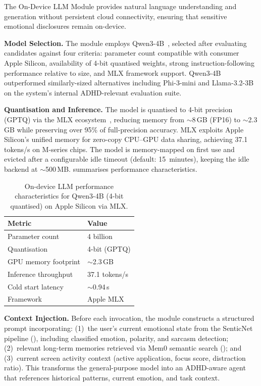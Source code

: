 The On-Device LLM Module provides natural language understanding and generation without persistent cloud connectivity, ensuring that sensitive emotional disclosures remain on-device.

\textbf{Model Selection.} The module employs Qwen3-4B~\cite{yang2025}, selected after evaluating candidates against four criteria: parameter count compatible with consumer Apple Silicon, availability of 4-bit quantised weights, strong instruction-following performance relative to size, and MLX framework support. Qwen3-4B outperformed similarly-sized alternatives including Phi-3-mini and Llama-3.2-3B on the system's internal ADHD-relevant evaluation suite.

\textbf{Quantisation and Inference.} The model is quantised to 4-bit precision (GPTQ) via the MLX ecosystem~\cite{hannun2023}, reducing memory from $\sim$8\,GB (FP16) to $\sim$2.3\,GB while preserving over 95\% of full-precision accuracy. MLX exploits Apple Silicon's unified memory for zero-copy CPU--GPU data sharing, achieving 37.1 tokens/s on M-series chips. The model is memory-mapped on first use and evicted after a configurable idle timeout (default: 15~minutes), keeping the idle backend at $\sim$500\,MB.  summarises performance characteristics.

\begin{table}[htbp]
  \centering
  \caption{On-device LLM performance characteristics for Qwen3-4B (4-bit quantised) on Apple Silicon via MLX.}
  \label{tab:llm_performance}
  \begin{tabular}{ll}
    \toprule
    \textbf{Metric} & \textbf{Value} \\
    \midrule
    Parameter count        & 4 billion \\
    Quantisation           & 4-bit (GPTQ) \\
    GPU memory footprint   & $\sim$2.3\,GB \\
    Inference throughput   & 37.1 tokens/s \\
    Cold start latency     & $\sim$0.94\,s \\
    Framework              & Apple MLX \\
    \bottomrule
  \end{tabular}
\end{table}

\textbf{Context Injection.} Before each invocation, the module constructs a structured prompt incorporating: (1)~the user's current emotional state from the SenticNet pipeline (), including classified emotion, polarity, and sarcasm detection; (2)~relevant long-term memories retrieved via Mem0 semantic search (); and (3)~current screen activity context (active application, focus score, distraction ratio). This transforms the general-purpose model into an ADHD-aware agent that references historical patterns, current emotion, and task context.


